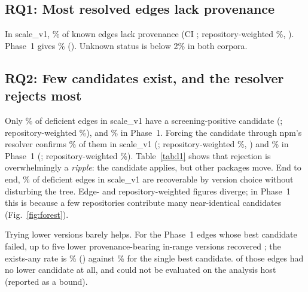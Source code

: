 \documentclass[conference]{IEEEtran}
\begin{document}
\subsection{RQ1: Most resolved edges lack provenance}
In scale\_v1, \SOPG\% of known edges lack provenance (CI \SOPGci;
repository-weighted \SOPGrepo\%, \SOPGrepoCi). Phase~1 gives \POneOPG\%
(\POneOPGci). Unknown status is below 2\% in both corpora.

\subsection{RQ2: Few candidates exist, and the resolver rejects most}
Only \SProxyPct\% of deficient edges in scale\_v1 have a screening-positive
candidate (\SProxyCi; repository-weighted \SProxyRepo\%), and \POneProxyPct\%
in Phase~1. Forcing the candidate through npm's resolver confirms
\SLPct\% of them in scale\_v1 (\SLCi; repository-weighted \SLRepo\%,
\SLRepoCi) and \LOnePct\% in Phase~1 (\LOneCi; repository-weighted \LOneRepo\%).
Table~\ref{tab:l1} shows that rejection is overwhelmingly a \emph{ripple}: the
candidate applies, but other packages move. End to end, \SEndToEnd\% of deficient
edges in scale\_v1 are recoverable by version choice without disturbing the
tree. Edge- and repository-weighted figures diverge; in Phase~1 this is because a
few repositories contribute many near-identical candidates
(Fig.~\ref{fig:forest}).

Trying lower versions barely helps. For the \AltPop{} Phase~1 edges whose
best candidate failed, up to five lower provenance-bearing in-range versions
recovered \AltRecovered{}; the exists-any rate is \AltExists\% (\AltExistsCi)
against \LOnePct\% for the single best candidate. \AltNoAlt{} of those edges had
no lower candidate at all, and \AltBlocked{} could not be evaluated on the
analysis host (reported as a bound).

\begin{table}[t]
\centering
\caption{Layer 1 outcomes (screening-positive edges).}
\label{tab:l1}

\end{table}
\end{document}
